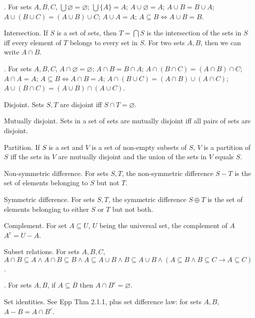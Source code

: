 \documentclass{slnotes}
\begin{document}
. For sets \(A, B, C\), \(\bigcup\varnothing = \varnothing\); \(\bigcup\{A\}=A\); \(A\cup\varnothing=A\); \(A\cup B=B\cup A\); \(A\cup (B\cup C) = (A\cup B)\cup C\); \(A\cup A = A\); \(A \subseteq B \Leftrightarrow A\cup B = B\).

 Intersection. If \(S\) is a set of sets, then \(T = \bigcap S\) is the intersection of the sets in \(S\) iff every element of \(T\) belongs to every set in \(S\). For two sets \(A, B\), then we can write \(A \cap B\).

. For sets \(A, B, C\), \(A\cap\varnothing=\varnothing\); \(A\cap B=B\cap A\); \(A\cap (B\cap C) = (A\cap B)\cap C\); \(A\cap A = A\); \(A \subseteq B \Leftrightarrow A\cap B = A\); \(A \cap (B \cup C) = (A \cap B) \cup (A \cap C)\); \(A \cup (B \cap C) = (A \cup B) \cap (A \cup C)\).

 Disjoint. Sets \(S, T\) are disjoint iff \(S \cap T = \varnothing\).

 Mutually disjoint. Sets in a set of sets are mutually disjoint iff all pairs of sets are disjoint.

 Partition. If \(S\) is a set and \(V\) is a set of non-empty subsets of \(S\), \(V\) is a partition of \(S\) iff the sets in \(V\) are mutually disjoint and the union of the sets in \(V\) equals \(S\).

 Non-symmetric difference. For sets \(S, T\), the non-symmetric difference \(S - T\) is the set of elements belonging to \(S\) but not \(T\).

 Symmetric difference. For sets \(S, T\), the symmetric difference \(S \oplus T\) is the set of elements belonging to either \(S\) or \(T\) but not both.

 Complement. For set \(A \subseteq U\), \(U\) being the universal set, the complement of \(A\) \(A^c = U - A\).

 Subset relations. For sets \(A, B, C\), \(A \cap B \subseteq A \land A \cap B \subseteq B \land A \subseteq A \cup B \land B \subseteq A \cup B \land (A \subseteq B \land B \subseteq C \to A \subseteq C)\).

. For sets \(A, B\), if \(A \subseteq B\) then \(A \cap B^c = \varnothing\).

 Set identities. See Epp Thm 2.1.1, plus set difference law: for sets \(A, B\), \(A - B = A \cap B^c\).
\end{document}
